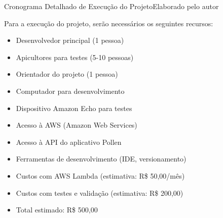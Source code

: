 \begin{quadro}{Cronograma Detalhado de Execução do Projeto}{Elaborado pelo autor}
\label{quad:cronograma-detalhado}
\renewcommand{\arraystretch}{1.3}
\end{quadro}

\label{sec:recursos-necessarios}

Para a execução do projeto, serão necessários os seguintes recursos:

\begin{itemize}
    \item Desenvolvedor principal (1 pessoa)
    \item Apicultores para testes (5-10 pessoas)
    \item Orientador do projeto (1 pessoa)
\end{itemize}

\begin{itemize}
    \item Computador para desenvolvimento
    \item Dispositivo Amazon Echo para testes
    \item Acesso à AWS (Amazon Web Services)
    \item Acesso à API do aplicativo Pollen
    \item Ferramentas de desenvolvimento (IDE, versionamento)
\end{itemize}

\begin{itemize}
    \item Custos com AWS Lambda (estimativa: R\$ 50,00/mês)
    \item Custos com testes e validação (estimativa: R\$ 200,00)
    \item Total estimado: R\$ 500,00
\end{itemize}